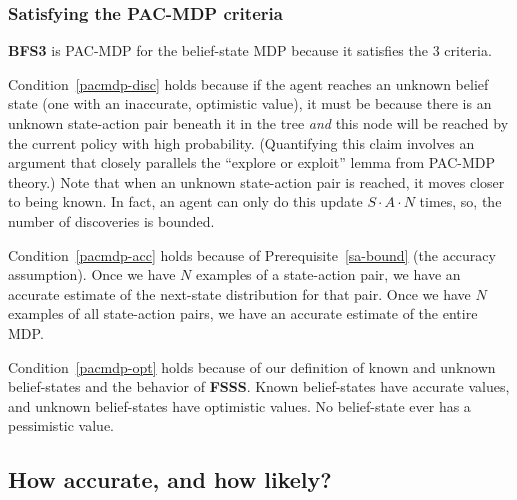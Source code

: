 \subsubsection{Satisfying the PAC-MDP criteria}

{\bf BFS3} is PAC-MDP for the belief-state MDP because it satisfies the 3 criteria.

Condition~\ref{pacmdp-disc} holds because if the agent reaches an unknown belief state (one with an inaccurate, optimistic value), it must be because there is an unknown state-action pair beneath it in the tree \emph{and} this node will be reached by the current policy with high probability.  (Quantifying this claim involves an argument that closely parallels the ``explore or exploit'' lemma from PAC-MDP theory.)  Note that when an unknown state-action pair is reached, it moves closer to being known.  In fact, an agent can only do this update $S\cdot A \cdot N$ times, so, the number of discoveries is bounded.


Condition~\ref{pacmdp-acc} holds because of Prerequisite~\ref{sa-bound} (the accuracy assumption). Once we have $N$ examples of a state-action pair, we have an accurate estimate of the next-state distribution for that pair. Once we have $N$ examples of all state-action pairs, we have an accurate estimate of the entire MDP.


Condition~\ref{pacmdp-opt} holds because of our definition of known and unknown belief-states and the behavior of {\bf FSSS}. Known belief-states have accurate values, and unknown belief-states have optimistic values. No belief-state ever has a pessimistic value.

\subsection{How accurate, and how likely?}

